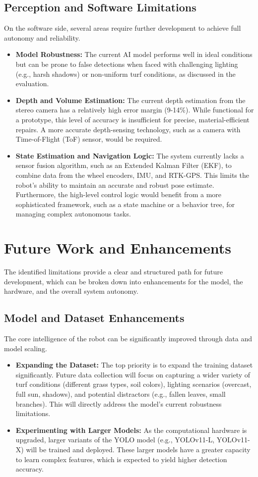 \subsection{Perception and Software Limitations}
On the software side, several areas require further development to achieve full autonomy and reliability.
\begin{itemize}
    \item \textbf{Model Robustness:} The current AI model performs well in ideal conditions but can be prone to false detections when faced with challenging lighting (e.g., harsh shadows) or non-uniform turf conditions, as discussed in the evaluation.
    \item \textbf{Depth and Volume Estimation:} The current depth estimation from the stereo camera has a relatively high error margin (9-14\%). While functional for a prototype, this level of accuracy is insufficient for precise, material-efficient repairs. A more accurate depth-sensing technology, such as a camera with Time-of-Flight (ToF) sensor, would be required.
    \item \textbf{State Estimation and Navigation Logic:} The system currently lacks a sensor fusion algorithm, such as an Extended Kalman Filter (EKF), to combine data from the wheel encoders, IMU, and RTK-GPS. This limits the robot's ability to maintain an accurate and robust pose estimate. Furthermore, the high-level control logic would benefit from a more sophisticated framework, such as a state machine or a behavior tree, for managing complex autonomous tasks.
\end{itemize}

\section{Future Work and Enhancements}
The identified limitations provide a clear and structured path for future development, which can be broken down into enhancements for the model, the hardware, and the overall system autonomy.

\subsection{Model and Dataset Enhancements}
The core intelligence of the robot can be significantly improved through data and model scaling.
\begin{itemize}
    \item \textbf{Expanding the Dataset:} The top priority is to expand the training dataset significantly. Future data collection will focus on capturing a wider variety of turf conditions (different grass types, soil colors), lighting scenarios (overcast, full sun, shadows), and potential distractors (e.g., fallen leaves, small branches). This will directly address the model's current robustness limitations.
    \item \textbf{Experimenting with Larger Models:} As the computational hardware is upgraded, larger variants of the YOLO model (e.g., YOLOv11-L, YOLOv11-X) will be trained and deployed. These larger models have a greater capacity to learn complex features, which is expected to yield higher detection accuracy.
\end{itemize}

